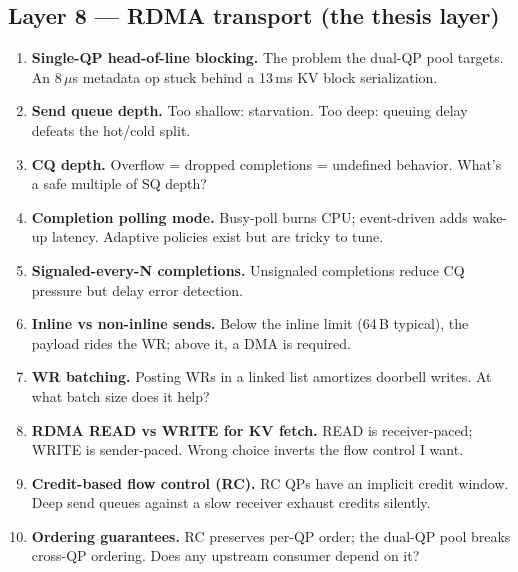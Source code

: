\documentclass[11pt]{article}
\begin{document}
\subsection*{Layer 8 --- RDMA transport (the thesis layer)}
\begin{enumerate}[resume]
\item \textbf{Single-QP head-of-line blocking.} The problem the
dual-QP pool targets. An 8\,$\mu$s metadata op stuck behind a 13\,ms
KV block serialization.
\item \textbf{Send queue depth.} Too shallow: starvation. Too deep:
queuing delay defeats the hot/cold split.
\item \textbf{CQ depth.} Overflow = dropped completions = undefined
behavior. What's a safe multiple of SQ depth?
\item \textbf{Completion polling mode.} Busy-poll burns CPU;
event-driven adds wake-up latency. Adaptive policies exist but are
tricky to tune.
\item \textbf{Signaled-every-N completions.} Unsignaled completions
reduce CQ pressure but delay error detection.
\item \textbf{Inline vs non-inline sends.} Below the inline limit
(64\,B typical), the payload rides the WR; above it, a DMA is
required.
\item \textbf{WR batching.} Posting WRs in a linked list amortizes
doorbell writes. At what batch size does it help?
\item \textbf{RDMA READ vs WRITE for KV fetch.} READ is receiver-paced;
WRITE is sender-paced. Wrong choice inverts the flow control I want.
\item \textbf{Credit-based flow control (RC).} RC QPs have an implicit
credit window. Deep send queues against a slow receiver exhaust
credits silently.
\item \textbf{Ordering guarantees.} RC preserves per-QP order; the
dual-QP pool breaks cross-QP ordering. Does any upstream consumer
depend on it?
\end{enumerate}
\end{document}
